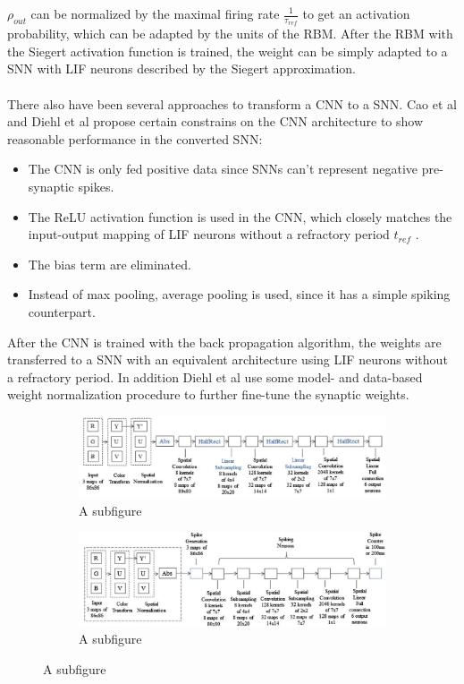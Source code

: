 $\rho_{out}$ can be normalized by the maximal firing rate $\frac{1}{\tau_{ref}}$ to get an activation probability, which can be adapted by the units of the RBM. 
After the RBM with the Siegert activation function is trained, the weight can be simply adapted to a SNN with LIF neurons described by the Siegert approximation.
\\
\\
There also have been several approaches to transform a CNN to a SNN.  
Cao et al and Diehl et al propose certain constrains on the CNN architecture to show reasonable performance in the converted SNN:
\begin{itemize}
\item The CNN is only fed positive data since SNNs can't represent negative pre-synaptic spikes. 
\item The ReLU activation function is used in the CNN, which closely matches the input-output mapping of LIF neurons without a refractory period $t_{ref}$ .
\item The bias term are eliminated.
\item Instead of max pooling, average pooling is used, since it has a simple spiking counterpart.
\end{itemize}
After the CNN is trained with the back propagation algorithm, the weights are transferred to a SNN with an equivalent architecture using LIF neurons without a refractory period. 
In addition Diehl et al use some model- and data-based weight normalization procedure to further fine-tune the synaptic weights. 

\begin{figure}
	\centering
	\begin{subfigure}[t]{.50\textwidth}
  		\centering
  		\includegraphics[width=.9\linewidth]{imgs/cnn_snn_conv1.jpg}
  		\caption{A subfigure}
  		\label{fig:sub1}
	\end{subfigure}%
	\begin{subfigure}[t]{.50\textwidth}
  		\centering
  		\includegraphics[width=.9\linewidth]{imgs/cnn_snn_conv2.jpg}
  		\caption{A subfigure}
  		\label{fig:sub2}
	\end{subfigure}
\end{figure}

